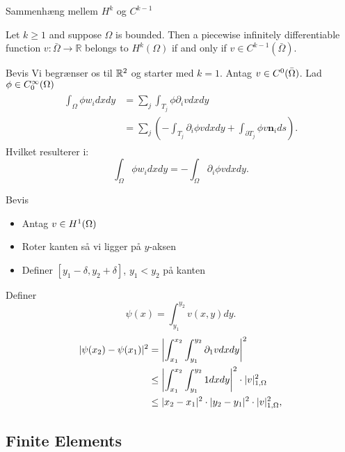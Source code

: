 \begin{frame}{Sammenhæng mellem $H^k$ og $C^{k-1}$}
   \begin{theorem}
    Let $k\geq1$ and suppose $\Omega$ is bounded. Then a piecewise infinitely differentiable function $v:\bar{\Omega}\rightarrow \mathbb{R}$
    belongs to $H^k(\Omega)$ if and only if $v\in C^{k-1}(\bar{\Omega})$.
   \end{theorem} 
\end{frame}
\begin{frame}{Bevis}
    Vi begrænser os til $\mathbb{R}^2$ og starter med $k=1$. Antag $v\in C^0(\bar{\Omega})$. 
    Lad $\phi \in C^\infty_0(\Omega)$
    \begin{align}
    \begin{split}
    \int_\Omega \phi w_i dxdy &= \sum_j\int_{T_j} \phi \partial_i v dx dy \\
        &= \sum_j \left( -\int_{T_j} \partial_i \phi v dxdy + \int_{\partial T_j} \phi v \mathbf{n}_i ds\right).
    \end{split}
    \end{align}
    Hvilket resulterer i:
    \begin{equation}
        \int_\Omega \phi w_i dxdy = -\int_\Omega \partial_i \phi v dxdy.
    \end{equation}
\end{frame}
\begin{frame}{Bevis}
   \begin{itemize}
    \item Antag $v\in H^1(\Omega)$ 
    \item Roter kanten så vi ligger på $y$-aksen 
    \item Definer $[y_1-\delta, y_2 +\delta]$, $y_1<y_2$ på kanten
   \end{itemize} 
   Definer 
    \begin{equation}
        \psi (x) = \int_{y_1}^{y_2} v(x,y) dy.
    \end{equation}
    \begin{align}
        |\psi(x_2) -\psi(x_1)|^2 &= \left| \int_{x_1}^{x_2} \int_{y_1}^{y_2} \partial_1 v dx dy \right|^2\\
        &\leq \left| \int_{x_1}^{x_2} \int_{y_1}^{y_2} 1 dx dy \right|^2 \cdot | v |_{1, \Omega}^2\\
        &\leq |x_2 - x_1|^2 \cdot |y_2 - y_1|^2 \cdot | v |_{1, \Omega}^2,
    \end{align}
\end{frame}
\subsection{Finite Elements}

